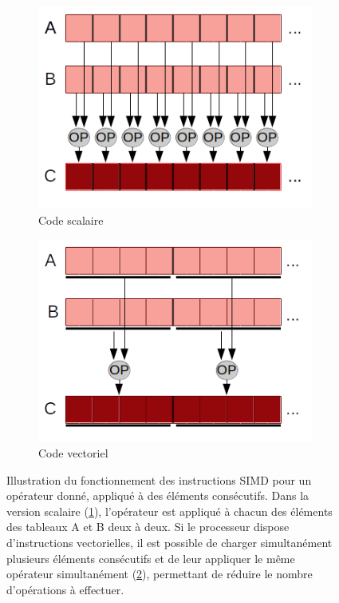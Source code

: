 \begin{figure}[!h]
  \centering
  \begin{subfigure}{.4\textwidth}
    \centering
    \includegraphics[width=\textwidth]{img/SIMD_scalar.png}
    \caption{Code scalaire}
    \label{fig:SIMD:scalar}
  \end{subfigure}
  \begin{subfigure}{.4\textwidth}
    \centering
    \includegraphics[width=\textwidth]{img/SIMD_vect.png}
    \caption{Code vectoriel}
    \label{fig:SIMD:vect}
  \end{subfigure}
  \caption{Illustration du fonctionnement des instructions SIMD pour un opérateur donné, appliqué à des éléments consécutifs. Dans la version scalaire (\ref{fig:SIMD:scalar}), l'opérateur est appliqué à chacun des éléments des tableaux A et B deux à deux. Si le processeur dispose d'instructions vectorielles, il est possible de charger simultanément plusieurs éléments consécutifs et de leur appliquer le même opérateur simultanément (\ref{fig:SIMD:vect}), permettant de réduire le nombre d'opérations à effectuer.}
  \label{fig:SIMD}
\end{figure}
